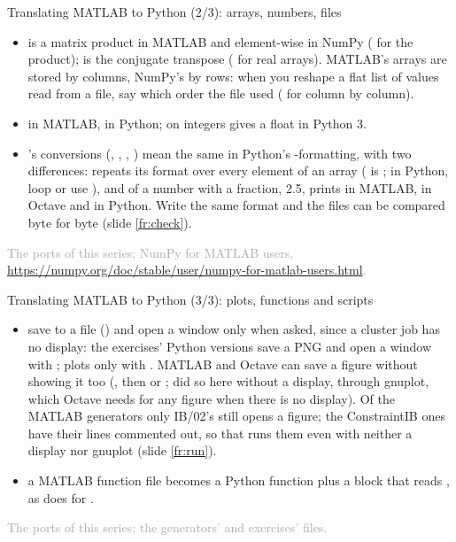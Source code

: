 \documentclass[aspectratio=169,11pt]{beamer}
\newcommand{\sourcecredit}[1]{\vfill\begin{flushright}\tiny\textcolor{DarkGray}{#1}\end{flushright}}
\begin{document}
\begin{frame}{Translating MATLAB to Python (2/3): arrays, numbers, files}
\label{fr:trans2}
\footnotesize
\begin{itemize}\setlength{\itemsep}{2pt}
  \item {}  is a matrix product in MATLAB and element-wise in NumPy ( for the product);  is the conjugate transpose ( for real arrays). MATLAB's arrays are stored by columns, NumPy's by rows: when you reshape a flat list of values read from a file, say which order the file used ( for column by column).
  \item {}  in MATLAB,  in Python; \code{/} on integers gives a float in Python 3.
  \item {} 's conversions (, , , ) mean the same in Python's \code{\%}-formatting, with two differences:  repeats its format over every element of an array ( is ; in Python, loop or use ), and  of a number with a fraction, 2.5, prints  in MATLAB,  in Octave and  in Python. Write the same format and the files can be compared byte for byte (slide \ref{fr:check}).
\end{itemize}
\sourcecredit{The ports of this series; NumPy for MATLAB users, \url{https://numpy.org/doc/stable/user/numpy-for-matlab-users.html}.}
\end{frame}

\begin{frame}{Translating MATLAB to Python (3/3): plots, functions and scripts}
\label{fr:trans3}
\footnotesize
\begin{itemize}\setlength{\itemsep}{2pt}
  \item {} save to a file () and open a window only when asked, since a cluster job has no display: the exercises' Python versions save a PNG and open a window with ;  plots only with . MATLAB and Octave can save a figure without showing it too (, then  or ;  did so here without a display, through gnuplot, which Octave needs for any figure when there is no display). Of the MATLAB generators only IB/02's  still opens a figure; the ConstraintIB ones have their  lines commented out, so that  runs them even with neither a display nor gnuplot (slide \ref{fr:run}).
  \item {} a MATLAB function file becomes a Python function plus a  block that reads , as  does for .
\end{itemize}
\sourcecredit{The ports of this series; the generators' and exercises' \code{README.md} files.}
\end{frame}
\end{document}
